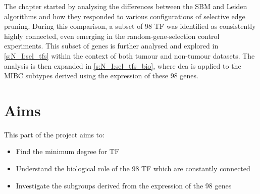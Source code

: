 The chapter started by analysing the differences between the SBM and Leiden algorithms and how they responded to various configurations of selective edge pruning. During this comparison, a subset of 98 TF was identified as consistently highly connected, even emerging in the random-gene-selection control experiments. This subset of genes is further analysed and explored in \cref{s:N_I:sel_tfs} within the context of both tumour and non-tumour datasets. The analysis is then expanded in \cref{s:N_I:sel_tfs_bio}, where \acrfull{dea} is applied to the MIBC subtypes derived using the expression of these 98 genes.





% 

\section{Aims}

This part of the project aims to:
\begin{itemize}
    \item Find the minimum degree for TF
    \item Understand the biological role of the 98 TF which are constantly connected
    \item Investigate the subgroups derived from the expression of the 98 genes
\end{itemize}


